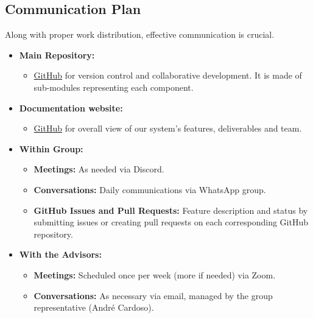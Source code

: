 \documentclass[a4paper,11pt]{article}
\begin{document}
        \subsection{Communication Plan}
            \quad Along with proper work distribution, effective communication is crucial.
            \begin{itemize}
                \item \textbf{Main Repository:} 
                \begin{itemize}
                    \item \href{https://github.com/Mycsina/DiSA/}{GitHub} for version control and collaborative development. It is made of sub-modules representing each component.
                \end{itemize}
                \item \textbf{Documentation website:}
                \begin{itemize}
                    \item \href{https://agh4m.github.io/PI-SITE/}{GitHub} for overall view of our system's features, deliverables and team.
                \end{itemize}
                \item \textbf{Within Group:}
                \begin{itemize}
                    \item \textbf{Meetings:} As needed via Discord.
                    \item \textbf{Conversations:} Daily communications via WhatsApp group.
                    \item \textbf{GitHub Issues and Pull Requests:} Feature description and status by submitting issues or creating pull requests on each corresponding GitHub repository.
                \end{itemize}
                \item \textbf{With the Advisors:}
                \begin{itemize}
                    \item \textbf{Meetings:} Scheduled once per week (more if needed) via Zoom.
                    \item \textbf{Conversations:} As necessary via email, managed by the group representative (André Cardoso).
                \end{itemize}
            \end{itemize}
            
\end{document}
